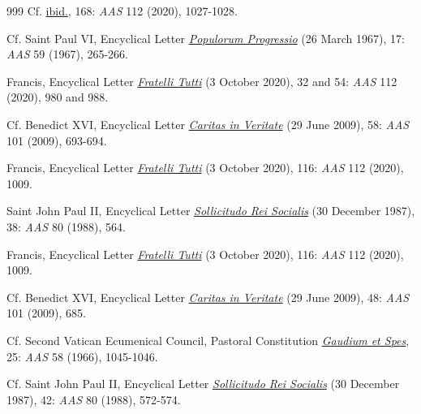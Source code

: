 \documentclass{article}
\begin{document}
\begin{thebibliography}{999}
 Cf. \href{https://www.vatican.va/content/francesco/en/encyclicals/documents/papa-francesco_20201003_enciclica-fratelli-tutti.html}{ibid.}, 168: \emph{AAS} 112 (2020), 1027-1028.

 Cf. Saint Paul VI, Encyclical Letter \href{https://www.vatican.va/content/paul-vi/en/encyclicals/documents/hf_p-vi_enc_26031967_populorum.html}{\emph{Populorum Progressio}} (26 March 1967), 17: \emph{AAS} 59 (1967), 265-266.

 Francis, Encyclical Letter \href{https://www.vatican.va/content/francesco/en/encyclicals/documents/papa-francesco_20201003_enciclica-fratelli-tutti.html}{\emph{Fratelli Tutti}} (3 October 2020), 32 and 54: \emph{AAS} 112 (2020), 980 and 988.

 Cf. Benedict XVI, Encyclical Letter \href{https://www.vatican.va/content/benedict-xvi/en/encyclicals/documents/hf_ben-xvi_enc_20090629_caritas-in-veritate.html}{\emph{Caritas in Veritate}} (29 June 2009), 58: \emph{AAS} 101 (2009), 693-694.

 Francis, Encyclical Letter \href{https://www.vatican.va/content/francesco/en/encyclicals/documents/papa-francesco_20201003_enciclica-fratelli-tutti.html}{\emph{Fratelli Tutti}} (3 October 2020), 116: \emph{AAS} 112 (2020), 1009.

 Saint John Paul II, Encyclical Letter \href{https://www.vatican.va/content/john-paul-ii/en/encyclicals/documents/hf_jp-ii_enc_30121987_sollicitudo-rei-socialis.html}{\emph{Sollicitudo Rei Socialis}} (30 December 1987), 38: \emph{AAS} 80 (1988), 564.

 Francis, Encyclical Letter \href{https://www.vatican.va/content/francesco/en/encyclicals/documents/papa-francesco_20201003_enciclica-fratelli-tutti.html}{\emph{Fratelli Tutti}} (3 October 2020), 116: \emph{AAS} 112 (2020), 1009.

 Cf. Benedict XVI, Encyclical Letter \href{https://www.vatican.va/content/benedict-xvi/en/encyclicals/documents/hf_ben-xvi_enc_20090629_caritas-in-veritate.html}{\emph{Caritas in Veritate}} (29 June 2009), 48: \emph{AAS} 101 (2009), 685.

 Cf. Second Vatican Ecumenical Council, Pastoral Constitution \href{https://www.vatican.va/archive/hist_councils/ii_vatican_council/documents/vat-ii_const_19651207_gaudium-et-spes_en.html}{\emph{Gaudium et Spes}}, 25: \emph{AAS} 58 (1966), 1045-1046.

 Cf. Saint John Paul II, Encyclical Letter \href{https://www.vatican.va/content/john-paul-ii/en/encyclicals/documents/hf_jp-ii_enc_30121987_sollicitudo-rei-socialis.html}{\emph{Sollicitudo Rei Socialis}} (30 December 1987), 42: \emph{AAS} 80 (1988), 572-574.


\end{thebibliography}
\end{document}
